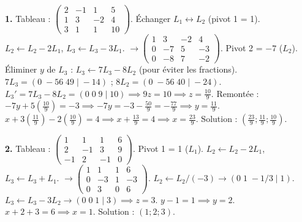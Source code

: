 \documentclass[11pt]{article}
\begin{document}
\begin{corrige}[Exercice n°1]
\textbf{1.} Tableau : $\left(\begin{array}{ccc|c} 2 & -1 & 1 & 5 \\ 1 & 3 & -2 & 4 \\ 3 & 1 & 1 & 10 \end{array}\right)$.
Échanger $L_1 \leftrightarrow L_2$ (pivot 1 = 1).
$L_2 \leftarrow L_2 - 2L_1$, $L_3 \leftarrow L_3 - 3L_1$.
$\to \left(\begin{array}{ccc|c} 1 & 3 & -2 & 4 \\ 0 & -7 & 5 & -3 \\ 0 & -8 & 7 & -2 \end{array}\right)$.
Pivot 2 = $-7$ ($L_2$). Éliminer $y$ de $L_3$ : $L_3 \leftarrow 7L_3 - 8L_2$ (pour éviter les fractions).
$7L_3 = (0\; -56\; 49\; |\; -14)$ ; $8L_2 = (0\; -56\; 40\; |\; -24)$.
$L_3' = 7L_3 - 8L_2 = (0\; 0\; 9\; |\; 10) \implies 9z = 10 \implies z = \frac{10}{9}$.
Remontée :
$-7y + 5(\frac{10}{9}) = -3 \implies -7y = -3 - \frac{50}{9} = -\frac{77}{9} \implies y = \frac{11}{9}$.
$x + 3(\frac{11}{9}) - 2(\frac{10}{9}) = 4 \implies x + \frac{13}{9} = 4 \implies x = \frac{23}{9}$.
Solution : $(\frac{23}{9} ; \frac{11}{9} ; \frac{10}{9})$.

\textbf{2.} Tableau : $\left(\begin{array}{ccc|c} 1 & 1 & 1 & 6 \\ 2 & -1 & 3 & 9 \\ -1 & 2 & -1 & 0 \end{array}\right)$.
Pivot 1 = 1 ($L_1$). $L_2 \leftarrow L_2 - 2L_1$, $L_3 \leftarrow L_3 + L_1$.
$\to \left(\begin{array}{ccc|c} 1 & 1 & 1 & 6 \\ 0 & -3 & 1 & -3 \\ 0 & 3 & 0 & 6 \end{array}\right)$.
$L_2 \leftarrow L_2/(-3) \to (0\; 1\; -1/3\; |\; 1)$.
$L_3 \leftarrow L_3 - 3L_2 \to (0\; 0\; 1\; |\; 3) \implies z=3$.
$y - 1 = 1 \implies y=2$.
$x + 2 + 3 = 6 \implies x=1$.
Solution : $(1; 2; 3)$.


\end{corrige}
\end{document}
